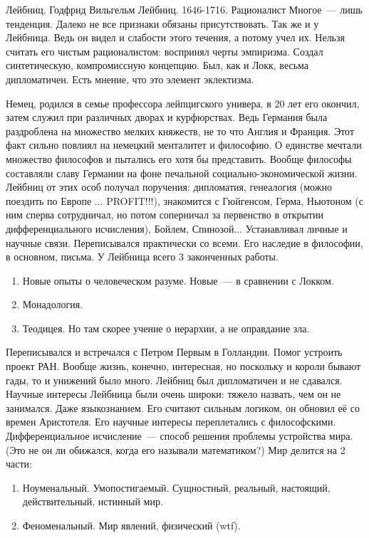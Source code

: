 Лейбниц. Годфрид Вильгельм Лейбниц. 1646-1716. Рационалист
Многое~--- лишь тенденция. Далеко не все признаки обязаны присутствовать. Так же и у Лейбница. Ведь он видел и слабости этого течения, а потому учел их. Нельзя считать его чистым рационалистом: воспринял черты эмпиризма. Создал синтетическую, компромиссную концепцию. Был, как и Локк, весьма дипломатичен. Есть мнение, что это элемент эклектизма.

Немец, родился в семье профессора лейпцигского универа, в 20 лет его окончил, затем служил при различных дворах и курфюрствах. Ведь Германия была раздроблена на множество мелких княжеств, не то что Англия и Франция. Этот факт сильно повлиял на немецкий менталитет и философию. О единстве мечтали множество философов и пытались его хотя бы представить. Вообще философы составляли славу Германии на фоне печальной социально-экономической жизни. Лейбниц от этих особ получал поручения: дипломатия, генеалогия (можно поездить по Европе ... PROFIT!!!), знакомится с Гюйгенсом, Герма, Ньютоном (с ним сперва сотрудничал, но потом соперничал за первенство в открытии дифференциального исчисления), Бойлем, Спинозой... Устанавливал личные и научные связи. Переписывался практически со всеми. Его наследие в философии, в основном, письма. У Лейбница всего 3 законченных работы.
\begin{enumerate}
	\item Новые опыты о человеческом разуме. Новые~--- в сравнении с Локком.
	\item Монадология.
	\item Теодицея. Но там скорее учение о иерархии, а не оправдание зла.
\end{enumerate}
	
Переписывался и встречался с Петром Первым в Голландии. Помог устроить проект РАН. Вообще жизнь, конечно, интересная, но поскольку и короли бывают гады, то и унижений было много. Лейбниц был дипломатичен и не сдавался.
Научные интересы Лейбница были очень широки: тяжело назвать, чем он не занимался. Даже языкознанием. Его считают сильным логиком, он обновил её со времен Аристотеля. Его научные интересы переплетались с философскими. Дифференциальное исчисление~--- способ решения проблемы устройства мира. (Это не он ли обижался, когда его называли математиком?)
Мир делится на 2 части: 
\begin{enumerate}
	\item Ноуменальный. Умопостигаемый. Сущностный, реальный, настоящий, действительный, истинный мир.
	\item Феноменальный. Мир явлений, физический (wtf).
\end{enumerate}

